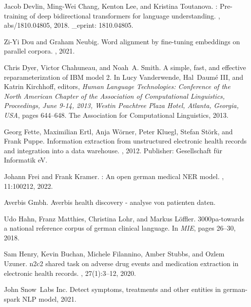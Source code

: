 \documentclass[runningheads]{llncs}
\begin{document}
\begin{thebibliography}{10}
Jacob Devlin, Ming-Wei Chang, Kenton Lee, and Kristina Toutanova.
: Pre-training of deep bidirectional transformers for language
  understanding.
, abs/1810.04805, 2018.
\newblock \_eprint: 1810.04805.

Zi-Yi Dou and Graham Neubig.
\newblock Word alignment by fine-tuning embeddings on parallel corpora.
, 2021.

Chris Dyer, Victor Chahuneau, and Noah~A. Smith.
\newblock A simple, fast, and effective reparameterization of {IBM} model 2.
\newblock In Lucy Vanderwende, Hal~Daumé {III}, and Katrin Kirchhoff, editors,
  {\em Human Language Technologies: Conference of the North American Chapter of
  the Association of Computational Linguistics, Proceedings, June 9-14, 2013,
  Westin Peachtree Plaza Hotel, Atlanta, Georgia, {USA}}, pages 644--648. The
  Association for Computational Linguistics, 2013.

Georg Fette, Maximilian Ertl, Anja Wörner, Peter Kluegl, Stefan Störk, and
  Frank Puppe.
\newblock Information extraction from unstructured electronic health records
  and integration into a data warehouse.
, 2012.
\newblock Publisher: Gesellschaft für Informatik {eV}.

Johann Frei and Frank Kramer.
: An open german medical {NER} model.
, 11:100212, 2022.

Averbis Gmbh.
\newblock Averbis health discovery - analyse von patienten daten.

Udo Hahn, Franz Matthies, Christina Lohr, and Markus Löffler.
\newblock 3000pa-towards a national reference corpus of german clinical
  language.
\newblock In {\em {MIE}}, pages 26--30, 2018.

Sam Henry, Kevin Buchan, Michele Filannino, Amber Stubbs, and Ozlem Uzuner.
 n2c2 shared task on adverse drug events and medication
  extraction in electronic health records.
, 27(1):3--12, 2020.

John Snow~Labs Inc.
\newblock Detect symptoms, treatments and other entities in german- spark {NLP}
  model, 2021.


\end{thebibliography}
\end{document}
